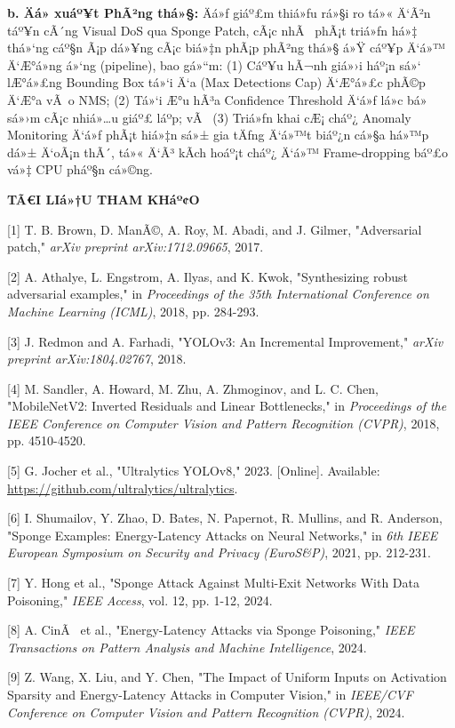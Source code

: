 \documentclass[]{article}
\begin{document}
\textbf{b. Äá» xuáº¥t PhÃ²ng thá»§:} Äá»ƒ giáº£m thiá»ƒu rá»§i
ro tá»« Ä‘Ã²n táº¥n cÃ´ng Visual DoS qua Sponge Patch, cÃ¡c nhÃ  phÃ¡t triá»ƒn há»‡
thá»‘ng cáº§n Ã¡p dá»¥ng cÃ¡c biá»‡n phÃ¡p phÃ²ng thá»§ á»Ÿ cáº¥p Ä‘á»™ Ä‘Æ°á»ng á»‘ng (pipeline),
bao gá»“m: (1) Cáº¥u hÃ¬nh giá»›i háº¡n sá»‘ lÆ°á»£ng Bounding Box tá»‘i Ä‘a (Max
Detections Cap) Ä‘Æ°á»£c phÃ©p Ä‘Æ°a vÃ o NMS; (2) Tá»‘i Æ°u hÃ³a Confidence 
Threshold Ä‘á»ƒ lá»c bá» sá»›m cÃ¡c nhiá»…u giáº£ láº­p; vÃ  (3) Triá»ƒn
khai cÆ¡ cháº¿ Anomaly Monitoring Ä‘á»ƒ phÃ¡t hiá»‡n sá»± gia
tÄƒng Ä‘á»™t biáº¿n cá»§a há»™p dá»± Ä‘oÃ¡n thÃ´, tá»« Ä‘Ã³ kÃ­ch hoáº¡t cháº¿ Ä‘á»™ Frame-dropping
báº£o vá»‡ CPU pháº§n cá»©ng.

\textbf{\hfill\break
TÃ€I LIá»†U THAM KHáº¢O}

{[}1{]} T. B. Brown, D. ManÃ©, A. Roy, M. Abadi, and J. Gilmer,
"Adversarial patch," \emph{arXiv preprint arXiv:1712.09665}, 2017.

{[}2{]} A. Athalye, L. Engstrom, A. Ilyas, and K. Kwok, "Synthesizing
robust adversarial examples," in \emph{Proceedings of the 35th
International Conference on Machine Learning (ICML)}, 2018, pp. 284-293.

{[}3{]} J. Redmon and A. Farhadi, "YOLOv3: An Incremental Improvement,"
\emph{arXiv preprint arXiv:1804.02767}, 2018.

{[}4{]} M. Sandler, A. Howard, M. Zhu, A. Zhmoginov, and L. C. Chen,
"MobileNetV2: Inverted Residuals and Linear Bottlenecks," in
\emph{Proceedings of the IEEE Conference on Computer Vision and Pattern
Recognition (CVPR)}, 2018, pp. 4510-4520.

{[}5{]} G. Jocher et al., "Ultralytics YOLOv8," 2023. {[}Online{]}.
Available: \url{https://github.com/ultralytics/ultralytics}.

{[}6{]} I. Shumailov, Y. Zhao, D. Bates, N. Papernot, R. Mullins, and R.
Anderson, "Sponge Examples: Energy-Latency Attacks on Neural Networks,"
in \emph{6th IEEE European Symposium on Security and Privacy
(EuroS\&P)}, 2021, pp. 212-231.

{[}7{]} Y. Hong et al., "Sponge Attack Against Multi-Exit Networks With
Data Poisoning," \emph{IEEE Access}, vol. 12, pp. 1-12, 2024.

{[}8{]} A. CinÃ  et al., "Energy-Latency Attacks via Sponge Poisoning,"
\emph{IEEE Transactions on Pattern Analysis and Machine Intelligence},
2024.

{[}9{]} Z. Wang, X. Liu, and Y. Chen, "The Impact of Uniform Inputs on
Activation Sparsity and Energy-Latency Attacks in Computer Vision," in
\emph{IEEE/CVF Conference on Computer Vision and Pattern Recognition
(CVPR)}, 2024.
\end{document}
